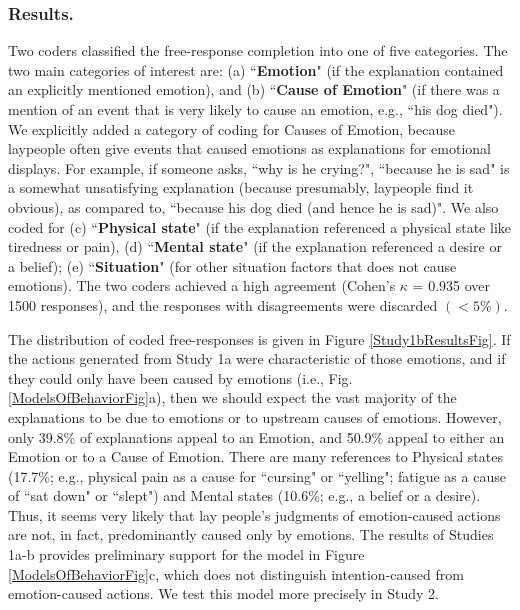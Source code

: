 \documentclass[10pt,letterpaper]{article}
\newcommand{\ndg}[1]{\textcolor{Green}{[ndg: #1]}}
\begin{document}
\subsubsection{Results.} 
Two coders classified the free-response completion into one of five categories. The two main categories of interest are: (a) ``\textbf{Emotion}" (if the explanation contained an explicitly mentioned emotion), and (b) ``\textbf{Cause of Emotion}" (if there was a mention of an event that is very likely to cause an emotion, e.g., ``his dog died"). 
We explicitly added a category of coding for Causes of Emotion, because laypeople often give events that caused emotions as explanations for emotional displays. For example, if someone asks, ``why is he crying?", ``because he is sad" is a somewhat unsatisfying explanation (because presumably, laypeople find it obvious), as compared to, ``because his dog died (and hence he is sad)". 
We also coded for (c) ``\textbf{Physical state}" (if the explanation referenced a physical state like tiredness or pain), (d) ``\textbf{Mental state}" (if the explanation referenced a desire or a belief); (e) ``\textbf{Situation}" (for other situation factors that does not cause emotions). The two coders achieved a high agreement (Cohen's $\kappa$ = 0.935 over 1500 responses), and the responses with disagreements were discarded $(<5\%)$. 

The distribution of coded free-responses is given in Figure \ref{Study1bResultsFig}. %
If the actions generated from Study 1a were characteristic of those emotions, and if they could only have been caused by emotions (i.e., Fig. \ref{ModelsOfBehaviorFig}a), then we should expect the vast majority of the explanations to be due to emotions or to upstream causes of emotions. However, only 39.8\% of explanations appeal to an Emotion, and 50.9\% appeal to either an Emotion or to a Cause of Emotion. 
There are many references to Physical states (17.7\%; e.g., physical pain as a cause for ``cursing" or ``yelling"; fatigue as a cause of ``sat down" or ``slept") and Mental states (10.6\%; e.g., a belief or a desire). 
Thus, it seems very likely that lay people's judgments of emotion-caused actions are not, in fact, predominantly caused only by emotions. 
The results of Studies 1a-b provides preliminary support for the model in Figure \ref{ModelsOfBehaviorFig}c, which does not distinguish intention-caused from emotion-caused actions. 
We test this model more precisely in Study 2.
\end{document}
